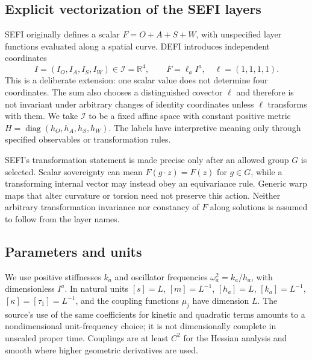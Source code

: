 \documentclass[aip,jmp,reprint,onecolumn,amsmath,amssymb]{revtex4-2}
\newcommand{\I}{\mathcal I}
\begin{document}
\subsection{Explicit vectorization of the SEFI layers}
SEFI originally defines a scalar $F=O+A+S+W$, with unspecified layer functions evaluated along a spatial curve. DEFI introduces independent coordinates
\begin{equation}
 I=(I_O,I_A,I_S,I_W)\in\I=\mathbb R^4,
 \qquad F=\ell_a I^a,\quad \ell=(1,1,1,1).
 \label{eq:identity}
\end{equation}
This is a deliberate extension: one scalar value does not determine four coordinates. The sum also chooses a distinguished covector $\ell$ and therefore is not invariant under arbitrary changes of identity coordinates unless $\ell$ transforms with them. We take $\I$ to be a fixed affine space with constant positive metric $H=\operatorname{diag}(h_O,h_A,h_S,h_W)$. The labels have interpretive meaning only through specified observables or transformation rules.

SEFI's transformation statement is made precise only after an allowed group $G$ is selected. Scalar sovereignty can mean $F(g\cdot z)=F(z)$ for $g\in G$, while a transforming internal vector may instead obey an equivariance rule. Generic warp maps that alter curvature or torsion need not preserve this action. Neither arbitrary transformation invariance nor constancy of $F$ along solutions is assumed to follow from the layer names.

\subsection{Parameters and units}
We use positive stiffnesses $k_a$ and oscillator frequencies $\omega_a^2=k_a/h_a$, with dimensionless $I^a$. In natural units $[s]=L$, $[m]=L^{-1}$, $[h_a]=L$, $[k_a]=L^{-1}$, $[\kappa]=[\tau_1]=L^{-1}$, and the coupling functions $\mu_j$ have dimension $L$. The source's use of the same coefficients for kinetic and quadratic terms amounts to a nondimensional unit-frequency choice; it is not dimensionally complete in unscaled proper time. Couplings are at least $C^2$ for the Hessian analysis and smooth where higher geometric derivatives are used.
\end{document}
